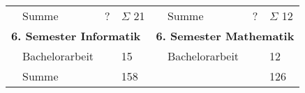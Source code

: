 \documentclass[a4paper,landscape]{scrartcl}
\begin{document}
\begin{savenotes}
\begin{tabular}{llll || llll}
            & Summe                         &? &$\Sigma$ 21 &   & Summe                           & ? & $\Sigma$ 12 \\
\multicolumn{4}{l}{\cellcolor{blue!25} \bfseries{6. Semester Informatik}} & \multicolumn{4}{l}{\cellcolor{blue!25} \bfseries{6. Semester Mathematik}}\\
            & Bachelorarbeit                &       & 15  &          & Bachelorarbeit               &       & 12 \\
\hline
\hline
            & Summe                         &       & 158 &          &                              &       & 126 \\
\end{tabular}
\end{savenotes}
\end{document}
